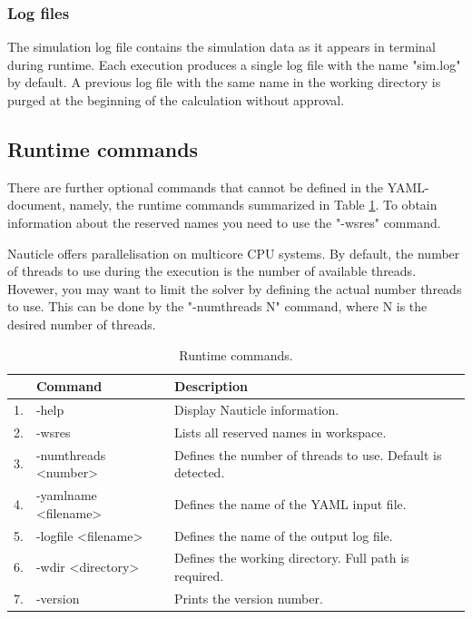 \documentclass[a4paper,12pt,openany]{book}
\theoremstyle{break}
\begin{document}
\subsubsection{Log files}
The simulation log file contains the simulation data as it appears in terminal during runtime. Each execution produces a single log file with the name "sim.log" by default. A previous log file with the same name in the working directory is purged at the beginning of the calculation without approval.
\subsection{Runtime commands}
There are further optional commands that cannot be defined in the YAML-document, namely, the runtime commands summarized in Table \ref{tbl:runtime_commands}. To obtain information about the reserved names you need to use the "-wsres" command.

Nauticle offers parallelisation on multicore CPU systems. By default, the number of threads to use during the execution is the number of available threads. Hovewer, you may want to limit the solver by defining the actual number threads to use. This can be done by the "-numthreads N" command, where N is the desired number of threads. 
\begin{table} [h]
\begin{center}
\caption{Runtime commands.} \label{tbl:runtime_commands}
\begin{tabular}{ l l l }
\toprule[1.5pt]
\bf  & \bf Command & \bf Description\\
\midrule
1. & -help & Display Nauticle information. \\
2. & -wsres & Lists all reserved names in workspace. \\
3. & -numthreads <number> & Defines the number of threads to use. Default is detected. \\
4. & -yamlname <filename> & Defines the name of the YAML input file. \\
5. & -logfile <filename> & Defines the name of the output log file. \\
6. & -wdir <directory> & Defines the working directory. Full path is required. \\
7. & -version & Prints the version number. \\
\bottomrule[1.25pt]
\end{tabular}
\end{center}
\end{table}
\end{document}
